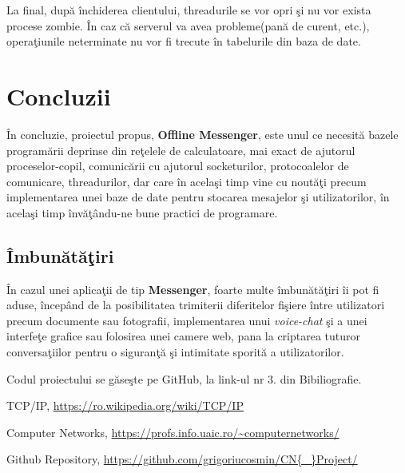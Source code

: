 \documentclass[runningheads]{llncs}
\begin{document}
	La final, dup\u a \^ inchiderea clientului, threadurile se vor opri \c si nu vor exista procese zombie. \^ In caz c\u a serverul va avea probleme(pan\u a de curent, etc.), opera\c tiunile neterminate nu vor fi trecute \^ in tabelurile din baza de date.

\section{Concluzii}

	\^ In concluzie, proiectul propus, {\bf Offline Messenger}, este unul ce necesit\u a bazele program\u arii deprinse din re\c telele de calculatoare, mai exact de ajutorul proceselor-copil, comunic\u arii cu ajutorul socketurilor, protocoalelor de comunicare, threadurilor, dar care \^ in acela\c si timp vine cu nout\u a\c ti precum implementarea unei baze de date pentru stocarea mesajelor \c si utilizatorilor, \^ in acela\c si timp \^ inv\u a\c t\^ andu-ne bune practici de programare.

\subsection{\^ Imbun\u at\u a\c tiri}

	\^ In cazul unei aplica\c tii de tip {\bf Messenger}, foarte multe \^ imbun\u at\u a\c tiri \^ ii pot fi aduse, \^ incep\^ and de la posibilitatea trimiterii diferitelor fi\c siere \^ intre utilizatori precum documente sau fotografii, implementarea unui {\it voice-chat} \c si a unei interfe\c te grafice sau folosirea unei camere web, pana la criptarea tuturor conversa\c tiilor pentru o siguran\c t\u a \c si intimitate  sporit\u a a utilizatorilor.
	
	\vspace{0.5cm}
	
Codul proiectului se g\u ase\c ste pe GitHub, la link-ul nr 3. din Bibiliografie.

\begin{thebibliography}{8}
TCP/IP, \url{https://ro.wikipedia.org/wiki/TCP/IP}

Computer Networks, \url{https://profs.info.uaic.ro/~computernetworks/}

Github Repository, \url{https://github.com/grigoriucosmin/CN{\_}Project/}

\end{thebibliography}
\end{document}
